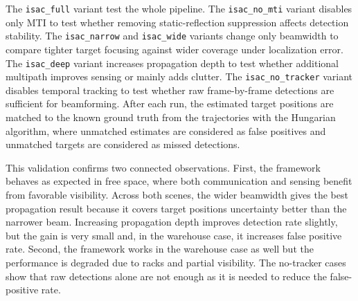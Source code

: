 The \texttt{isac\_full} variant test the whole pipeline.
The \texttt{isac\_no\_mti} variant disables only MTI to test whether removing static-reflection suppression affects detection stability.
The \texttt{isac\_narrow} and \texttt{isac\_wide} variants change only beamwidth to compare tighter target focusing against wider coverage under localization error.
The \texttt{isac\_deep} variant increases propagation depth to test whether additional multipath improves sensing or mainly adds clutter.
The \texttt{isac\_no\_tracker} variant disables temporal tracking to test whether raw frame-by-frame detections are sufficient for beamforming.
After each run, the estimated target positions are matched to the known ground truth from the trajectories with the Hungarian algorithm, where unmatched estimates are considered as false positives and unmatched targets are considered as missed detections.





This validation confirms two connected observations.
First, the framework behaves as expected in free space, where both communication and sensing benefit from favorable visibility.
Across both scenes, the wider beamwidth gives the best propagation result because it covers target positions uncertainty better than the narrower beam.
Increasing propagation depth improves detection rate slightly, but the gain is very small and, in the warehouse case, it increases false positive rate.
Second, the framework works in the warehouse case as well but the performance is degraded due to racks and partial visibility.
The no-tracker cases show that raw detections alone are not enough as it is needed to reduce the false-positive rate.